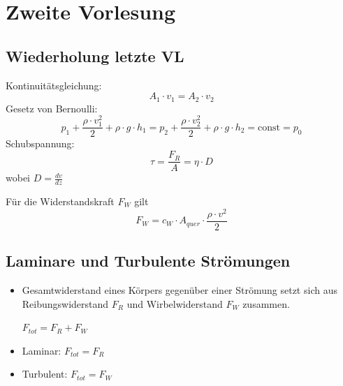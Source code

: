 \documentclass[a4paper,10pt]{article}
\begin{document}
\sidebar
{}
\par \vspace*{5mm}


\section{Zweite Vorlesung}
\subsection{Wiederholung letzte VL}

Kontinuitätsgleichung:
\begin{equation}
A_1 \cdot v_1 = A_2 \cdot v_2 
\end{equation}
Gesetz von Bernoulli:
\begin{equation}
p_1 + \frac{\rho \cdot v_1^2}{2} + \rho \cdot g \cdot h_1 = p_2 + \frac{\rho \cdot v_2^2}{2} + \rho \cdot g \cdot h_2 = \text{const} = p_0
\end{equation}
Schubspannung:
\begin{equation}
\tau = \frac{F_R}{A} = \eta \cdot D
\end{equation}
wobei $D = \frac{dv}{dz}$

\ppbig
\vspace*{5mm}
Für die Widerstandskraft $F_W$ gilt
\begin{equation}
F_W = c_W \cdot A_{quer} \cdot \frac{\rho \cdot v^2}{2}
\end{equation}


\subsection{Laminare und Turbulente Strömungen}
\begin{itemize}
\item Gesamtwiderstand eines Körpers gegenüber einer Strömung setzt sich aus Reibungswiderstand $F_R$ und Wirbelwiderstand $F_W$ zusammen. \par 
\begin{center}
$F_{tot} = F_R + F_W$ 
\end{center}
\item Laminar: $F_{tot} = F_R$
\item Turbulent: $F_{tot} = F_W$

\end{itemize}
\pp
\end{document}
